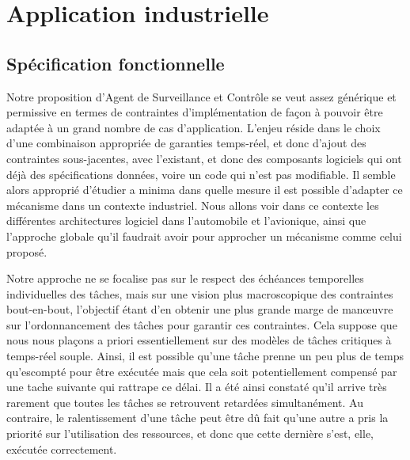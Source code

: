 \documentclass[french, a4paper, 11pt, twoside, pdftex]{StyleThese}
\begin{document}
\section{Application industrielle}
    \subsection{Spécification fonctionnelle}
    	Notre proposition d'Agent de Surveillance et Contrôle se veut assez générique et permissive en termes de contraintes d'implémentation de façon à pouvoir être adaptée à un grand nombre de cas d'application. L'enjeu réside dans le choix d'une combinaison appropriée de garanties temps-réel, et donc d'ajout des contraintes sous-jacentes, avec l'existant, et donc des composants logiciels qui ont déjà des spécifications données, voire un code qui n'est pas modifiable. Il semble alors approprié d'étudier a minima dans quelle mesure il est possible d'adapter ce mécanisme dans un contexte industriel. Nous allons voir dans ce contexte les différentes architectures logiciel dans l'automobile et l'avionique, ainsi que l'approche globale qu'il faudrait avoir pour approcher un mécanisme comme celui proposé.
    	
    	Notre approche ne se focalise pas sur le respect des échéances temporelles individuelles des tâches, mais sur une vision plus macroscopique des contraintes bout-en-bout, l'objectif étant d'en obtenir une plus grande marge de manœuvre sur l'ordonnancement des tâches pour garantir ces contraintes. Cela suppose que nous nous plaçons a priori essentiellement sur des modèles de tâches critiques à temps-réel souple. Ainsi, il est possible qu'une tâche prenne un peu plus de temps qu'escompté pour être exécutée mais que cela soit potentiellement compensé par une tache suivante qui rattrape ce délai. Il a été ainsi constaté qu'il arrive très rarement que toutes les tâches se retrouvent retardées simultanément. Au contraire, le ralentissement d'une tâche peut être dû fait qu'une autre a pris la priorité sur l'utilisation des ressources, et donc que cette dernière s'est, elle, exécutée correctement. 
    	
\end{document}
